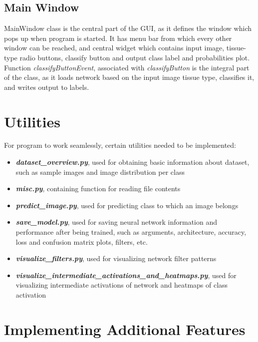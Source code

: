 \subsection{Main Window}

MainWindow class is the central part of the GUI, as it defines the window which pops up when program is started. It has menu bar from which every other window can be reached, and central widget which contains input image, tissue-type radio buttons, classify button and output class label and probabilities plot. Function \emph{classifyButtonEvent}, associated with \emph{classifyButton} is the integral part of the class, as it loads network based on the input image tissue type, classifies it, and writes output to labels.


\section{Utilities}

For program to work seamlessly, certain utilities needed to be implemented:
\begin{itemize}
	\itemsep 0em
	\item \textbf{\emph{dataset\_overview.py}}, used for obtaining basic information about dataset, such as sample images and image distribution per class
	\item \textbf{\emph{misc.py}}, containing function for reading file contents 
	\item \textbf{\emph{predict\_image.py}}, used for predicting class to which an image belongs
	\item \textbf{\emph{save\_model.py}}, used for saving neural network information and performance after being trained, such as arguments, architecture, accuracy, loss and confusion matrix plots, filters, etc.  
	\item \textbf{\emph{visualize\_filters.py}}, used for visualizing network filter patterns
	\item \textbf{\emph{visualize\_intermediate\_activations\_and\_heatmaps.py}}, used for visualizing intermediate activations of network and heatmaps of class activation
\end{itemize}

\section{Implementing Additional Features}

